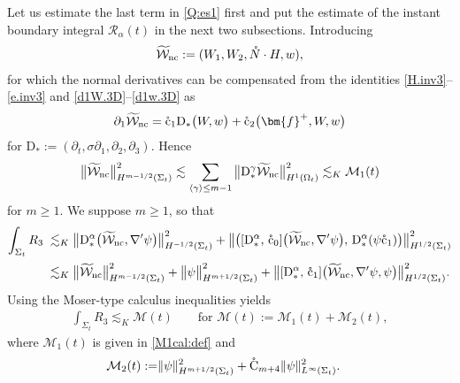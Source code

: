 \documentclass[twoside,11pt]{article}
\numberwithin{equation}{section}
\def\p{\partial}
\begin{document}
Let us estimate the last term in \eqref{Q:es1} first
and put the estimate of the instant boundary integral $\mathcal{R}_{\alpha}(t)$ in the next two subsections.
Introducing
\begin{align} \label{W.cal:nc}
	\widetilde{\mathcal{W}}_{\rm nc}:=
	(W_1,W_2, \mathring{N}\cdot H
	,  w),
\end{align}	
{for which the normal derivatives can be compensated from the identities \eqref{H.inv3}--\eqref{e.inv3} and \eqref{d1W.3D}--\eqref{d1w.3D} as }
\begin{align}
\label{W.cal:id}
	\p_1 \widetilde{\mathcal{W}}_{\rm nc}=
	\mathring{\rm c}_1\mathrm{D}_*\big( W,  w \big)
	+	\mathring{\rm c}_2\big(\bm{f}^+, W, w \big)
\end{align}
for $\mathrm{D}_*:=(\p_t,\sigma\p_1,\p_2,\p_3)$.
Hence
\begin{align}
	\big\| \widetilde{\mathcal{W}}_{\rm nc} \big\|_{H^{m-1/2}(\Sigma_t)}^2
	\lesssim \sum_{\langle\gamma\rangle\leq m-1}  \big\|\mathrm{D}_*^{\gamma}\widetilde{\mathcal{W}}_{\rm nc} \big\|_{H^{1}(\Omega_{t}) }^2
\lesssim_{K}  \mathcal{M}_1(t)
	\label{Wnc:es}
\end{align}
for $m\geq 1$.
We suppose $m\geq1$, so that
\begin{align}
	\nonumber
	\int_{\Sigma_{t}}R_3
	\;  & \lesssim_K  \big\|\mathrm{D}_*^{\alpha}\big(\widetilde{\mathcal{W}}_{\rm nc},\nabla'\psi\big) \big\|_{H^{-1/2}(\Sigma_t)}^2
	+ \big\|\big([\mathrm{D}_*^{\alpha},\, \mathring{\rm c}_0]\big(\widetilde{\mathcal{W}}_{\rm nc},\nabla'\psi\big),\, \mathrm{D}_*^{\alpha} (\psi \mathring{\rm c}_1 )\big) \big\|_{H^{1/2}(\Sigma_t)}^2  \\[0.5mm]
	\;  & \lesssim_K \big\|  \widetilde{\mathcal{W}}_{\rm nc}  \big\|_{H^{m-1/2}(\Sigma_t)}^2
	+\big\|\psi\big\|_{H^{m+1/2}(\Sigma_t)}^2
	+\big\|[\mathrm{D}_*^{\alpha},\, \mathring{\rm c}_1]\big(\widetilde{\mathcal{W}}_{\rm nc},\nabla'\psi, \psi\big) \big\|_{H^{1/2}(\Sigma_t)}^2. \nonumber
\end{align}
Using the Moser-type calculus inequalities yields
\begin{align}
		\int_{\Sigma_{t}}R_3 \lesssim_K   \mathcal{M}(t)
		\qquad \textrm{for \ }
	\mathcal{M}(t)	:=
		\mathcal{M}_1(t)+\mathcal{M}_2(t),	
	\label{R3:es}
\end{align}
where $\mathcal{M}_1(t)$ is given in \eqref{M1cal:def} and
\begin{align}
	\mathcal{M}_2(t):=
		&	{\|}\psi{\|}_{H^{m+1/2}(\Sigma_{t})}^2	+\mathring{\rm C}_{m+4}  \|\psi\|_{L^{\infty}(\Sigma_{t})}^2
.
 \label{M2cal:def}		
\end{align}
\end{document}
